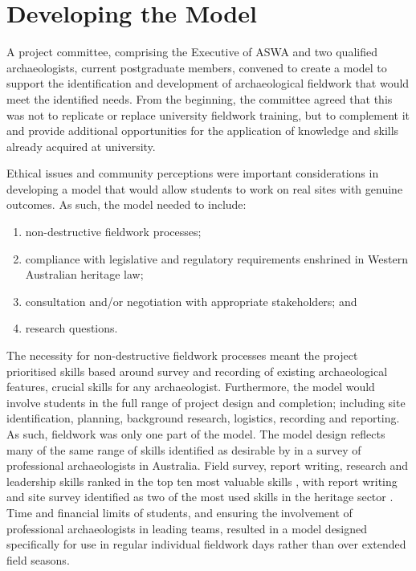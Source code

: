 \documentclass{ijsra}
\begin{document}
\section{Developing the Model}

A project committee, comprising the Executive of ASWA and two qualified archaeologists, current postgraduate members, convened to create a model to support the identification and development of archaeological fieldwork that would meet the identified needs. 
From the beginning, the committee agreed that this was not to replicate or replace university fieldwork training, but to complement it and provide additional opportunities for the application of knowledge and skills already acquired at university.

Ethical issues and community perceptions were important considerations in developing a model that would allow students to work on real sites with genuine outcomes. As such, the model needed to include:

\begin{enumerate}
	\item non-destructive fieldwork processes;
	\item compliance with legislative and regulatory requirements enshrined in Western Australian heritage law;
	\item consultation and/or negotiation with appropriate stakeholders; and
	\item research questions.
\end{enumerate}

The necessity for non-destructive fieldwork processes meant the project prioritised skills based around survey and recording of existing archaeological features, crucial skills for any archaeologist. 
Furthermore, the model would involve students in the full range of project design and completion; including site identification, planning, background research, logistics, recording and reporting. 
As such, fieldwork was only one part of the model. The model design reflects many of the same range of skills identified as desirable by \textcite[40-41]{ulm2013} in a survey of professional archaeologists in Australia. 
Field survey, report writing, research and leadership skills ranked in the top ten most valuable skills \parencite[40]{ulm2013}, 
with report writing and site survey identified as two of the most used skills in the heritage sector \parencite[10]{ireland2013}. 
Time and financial limits of students, and ensuring the involvement of professional archaeologists in leading teams, resulted in a model designed specifically for use in regular individual fieldwork days rather than over extended field seasons.
\end{document}
